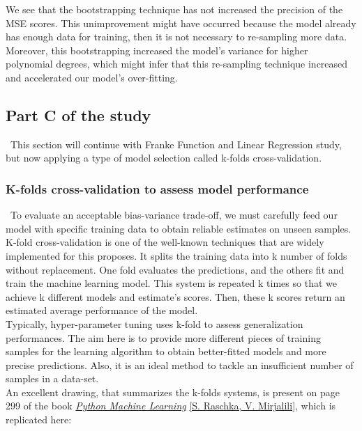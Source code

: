 We see that the bootstrapping technique has not increased the precision of the MSE scores. This unimprovement might have occurred because the model already has enough data for training, then it is not necessary to re-sampling more data. Moreover, this bootstrapping increased the model's variance for higher polynomial degrees, which might infer that this re-sampling technique increased and accelerated our model's over-fitting. \\

\subsection{Part C of the study}
\label{chap:Part C of the study}

\quad \, This section will continue with Franke Function and Linear Regression study, but now applying a type of model selection called k-folds cross-validation. \\

\subsubsection{K-folds cross-validation to assess model performance}
\label{chap:K-folds cross-validation to assess model performance}

\quad \, To evaluate an acceptable bias-variance trade-off, we must carefully feed our model with specific training data to obtain reliable estimates on unseen samples. K-fold cross-validation is one of the well-known techniques that are widely implemented for this proposes. It splits the training data into k number of folds without replacement. One fold evaluates the predictions, and the others fit and train the machine learning model. This system is repeated k times so that we achieve k different models and estimate's scores. Then, these k scores return an estimated average performance of the model. \\

Typically, hyper-parameter tuning uses k-fold to assess generalization performances. The aim here is to provide more different pieces of training samples for the learning algorithm to obtain better-fitted models and more precise predictions. Also, it is an ideal method to tackle an insufficient number of samples in a data-set. \\

An excellent drawing, that summarizes the k-folds systems, is present on page 299 of the book \hyperref[Bib:PythonMachineLearning]{\textit{Python Machine Learning}} \hyperref[Bib:PythonMachineLearning]{[S. Raschka, V. Mirjalili]}, which is replicated here: \\

